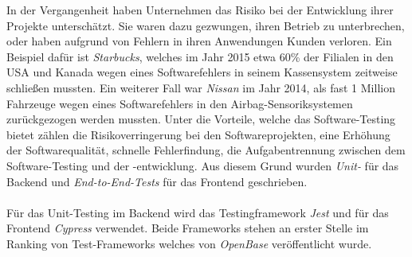 In der Vergangenheit haben Unternehmen das Risiko bei der Entwicklung ihrer Projekte unterschätzt. Sie waren dazu gezwungen, ihren Betrieb zu unterbrechen, oder haben aufgrund von Fehlern in ihren Anwendungen Kunden verloren. Ein Beispiel dafür ist \textit{Starbucks}, welches im Jahr 2015 etwa 60\% der Filialen in den USA und Kanada wegen eines Softwarefehlers in seinem Kassensystem zeitweise schließen mussten{\cite{QS1}}. Ein weiterer Fall war \textit{Nissan} im Jahr 2014, als fast 1 Million Fahrzeuge wegen eines Softwarefehlers in den Airbag-Sensoriksystemen zurückgezogen werden mussten{\cite{QS2}}. Unter die Vorteile, welche das Software-Testing bietet zählen die Risikoverringerung bei den Softwareprojekten, eine Erhöhung der Softwarequalität, schnelle Fehlerfindung, die Aufgabentrennung zwischen dem Software-Testing und der -entwicklung.  Aus diesem Grund wurden \textit{Unit-} für das Backend und \textit{End-to-End-Tests} für das Frontend geschrieben. 
\\\\
Für das Unit-Testing im Backend wird das Testingframework \textit{Jest} und für das Frontend \textit{Cypress} verwendet. Beide Frameworks stehen an erster Stelle im Ranking von Test-Frameworks welches von \textit{OpenBase} veröffentlicht wurde{\cite{QS3}}.

